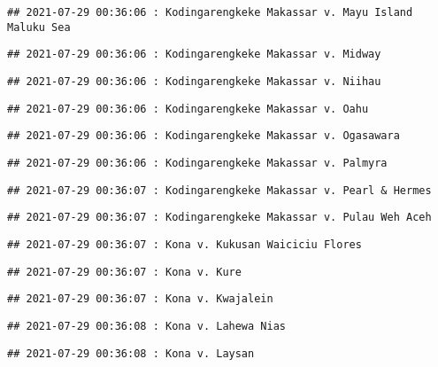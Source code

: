 \documentclass[
]{article}
\begin{document}
\begin{verbatim}
## 2021-07-29 00:36:06 : Kodingarengkeke Makassar v. Mayu Island Maluku Sea
\end{verbatim}

\begin{verbatim}
## 2021-07-29 00:36:06 : Kodingarengkeke Makassar v. Midway
\end{verbatim}

\begin{verbatim}
## 2021-07-29 00:36:06 : Kodingarengkeke Makassar v. Niihau
\end{verbatim}

\begin{verbatim}
## 2021-07-29 00:36:06 : Kodingarengkeke Makassar v. Oahu
\end{verbatim}

\begin{verbatim}
## 2021-07-29 00:36:06 : Kodingarengkeke Makassar v. Ogasawara
\end{verbatim}

\begin{verbatim}
## 2021-07-29 00:36:06 : Kodingarengkeke Makassar v. Palmyra
\end{verbatim}

\begin{verbatim}
## 2021-07-29 00:36:07 : Kodingarengkeke Makassar v. Pearl & Hermes
\end{verbatim}

\begin{verbatim}
## 2021-07-29 00:36:07 : Kodingarengkeke Makassar v. Pulau Weh Aceh
\end{verbatim}

\begin{verbatim}
## 2021-07-29 00:36:07 : Kona v. Kukusan Waiciciu Flores
\end{verbatim}

\begin{verbatim}
## 2021-07-29 00:36:07 : Kona v. Kure
\end{verbatim}

\begin{verbatim}
## 2021-07-29 00:36:07 : Kona v. Kwajalein
\end{verbatim}

\begin{verbatim}
## 2021-07-29 00:36:08 : Kona v. Lahewa Nias
\end{verbatim}

\begin{verbatim}
## 2021-07-29 00:36:08 : Kona v. Laysan
\end{verbatim}
\end{document}
